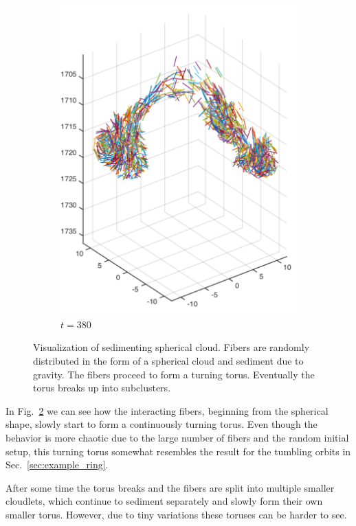\begin{figure}[!htbp]
\begin{subfigure}[h]{0.4\textwidth}
    \includegraphics[width=\textwidth]{img/state_00380.pdf}
    \caption{$t=380$}\label{fig:sphere_simulation_1d}
  \end{subfigure}
  \caption[Visualization of sedimenting spherical cloud.]{Visualization of sedimenting spherical cloud. Fibers are randomly distributed in the form of a spherical cloud and sediment due to gravity. The fibers proceed to form a turning torus. Eventually the torus breaks up into subclusters.}
  \label{fig:sphere_simulation}
\end{figure}

In Fig.~\ref{fig:sphere_simulation} we can see how the interacting fibers, beginning from the spherical shape, slowly start to form a continuously turning torus. Even though the behavior is more chaotic due to the large number of fibers and the random initial setup, this turning torus somewhat resembles the result for the tumbling orbits in Sec.~\ref{sec:example_ring}.

After some time the torus breaks and the fibers are split into multiple smaller cloudlets, which continue to sediment separately and slowly form their own smaller torus. However, due to tiny variations these toruses can be harder to see. 

